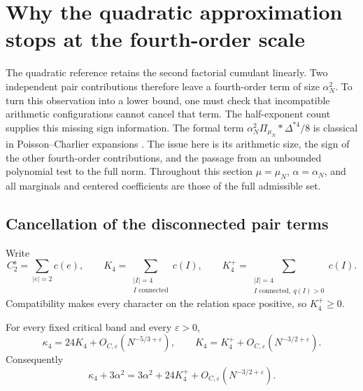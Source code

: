 \section{Why the quadratic approximation stops at the fourth-order scale}
\label{p13:lower:section}

The quadratic reference retains the second factorial cumulant linearly.
Two independent pair contributions therefore leave a fourth-order term of
size $\alpha_N^2$. To turn this observation into a lower bound, one must
check that incompatible arithmetic configurations cannot cancel that term.
The half-exponent count supplies this missing sign information.
The formal term \(\alpha_N^2\Pi_{\mu_N}*\Delta^{*4}/8\)
is classical in Poisson--Charlier expansions
\cite{bkn2014,cekanaviciusvellaisamy2015}. The issue here is its
arithmetic size, the sign of the other fourth-order contributions,
and the passage from an unbounded polynomial test to the full norm.
Throughout this section $\mu=\mu_N$, $\alpha=\alpha_N$, and all marginals
and centered coefficients are those of the full admissible set.

\subsection{Cancellation of the disconnected pair terms}

Write
\[
 C_2^{\mathrm s}=\sum_{|e|=2}c(e),\qquad
 K_4=\sum_{\substack{|I|=4\\I\text{ connected}}}c(I),\qquad
 K_4^+=\sum_{\substack{|I|=4\\I\text{ connected},\ q(I)>0}}c(I).
\]
Compatibility makes every character on the relation space positive, so
$K_4^+\geq0$.

\begin{lemma}
\label{p13:lower:quartic}
For every fixed critical band and every $\varepsilon>0$,
\begin{equation}
 \kappa_4=24K_4+O_{C,\varepsilon}(N^{-5/3+\varepsilon}),\qquad
 K_4=K_4^++O_{C,\varepsilon}(N^{-3/2+\varepsilon}).
 \label{p13:lower:quartic-identities}
\end{equation}
Consequently
\begin{equation}
 \kappa_4+3\alpha^2
 =3\alpha^2+24K_4^++O_{C,\varepsilon}(N^{-3/2+\varepsilon}).
 \label{p13:lower:positive-quartic}
\end{equation}
\end{lemma}

